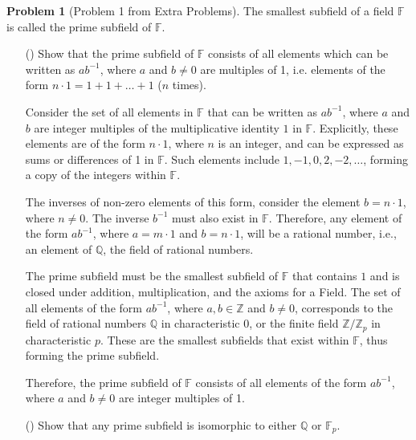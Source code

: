 \documentclass[12pt]{article}
\theoremstyle{definition}
\newtheorem{problem}{Problem}
\newcounter{subq}[problem]
\newenvironment{subproblem}
{\refstepcounter{subq} \begin{itemize} \item[(\alph{subq})]}
{\end{itemize} \medskip}
\begin{document}
\begin{problem}[Problem 1 from Extra Problems]
    The smallest subfield of a field $\mathbb{F}$ is called the prime subfield of $\mathbb{F}$.

    \begin{subproblem}
        Show that the prime subfield of $\mathbb{F}$ consists of all elements which can be written as $ab^{-1}$, where $a$ and $b \neq 0$ are multiples of 1, i.e. elements of the form $n \cdot 1 = 1 + 1 + \ldots + 1$ ($n$ times).

        \begin{solution}
            Consider the set of all elements in \( \mathbb{F} \) that can be written as \( ab^{-1} \), where \( a \) and \( b \) are integer multiples of the multiplicative identity \( 1 \) in \( \mathbb{F} \). Explicitly, these elements are of the form \( n \cdot 1 \), where \( n \) is an integer, and can be expressed as sums or differences of 1 in \( \mathbb{F} \). Such elements include \( 1, -1, 0, 2, -2, \ldots \), forming a copy of the integers within \( \mathbb{F} \).

            The inverses of non-zero elements of this form, consider the element \( b = n \cdot 1 \), where \( n \neq 0 \). The inverse \( b^{-1} \) must also exist in \( \mathbb{F} \). Therefore, any element of the form \( ab^{-1} \), where \( a = m \cdot 1 \) and \( b = n \cdot 1 \), will be a rational number, i.e., an element of \( \mathbb{Q} \), the field of rational numbers.
    
            The prime subfield must be the smallest subfield of \( \mathbb{F} \) that contains \( 1 \) and is closed under addition, multiplication, and the axioms for a Field. The set of all elements of the form \( ab^{-1} \), where \( a, b \in \mathbb{Z} \) and \( b \neq 0 \), corresponds to the field of rational numbers \( \mathbb{Q} \) in characteristic 0, or the finite field \( \mathbb{Z}/\mathbb{Z}_p \) in characteristic \( p \). These are the smallest subfields that exist within \( \mathbb{F} \), thus forming the prime subfield.
    
            Therefore, the prime subfield of \( \mathbb{F} \) consists of all elements of the form \( ab^{-1} \), where \( a \) and \( b \neq 0 \) are integer multiples of 1.
        \end{solution}
    \end{subproblem}

    \begin{subproblem}
        Show that any prime subfield is isomorphic to either $\mathbb{Q}$ or $\mathbb{F}_p$.
        \begin{solution}


\end{solution}
\end{subproblem}
\end{problem}
\end{document}
